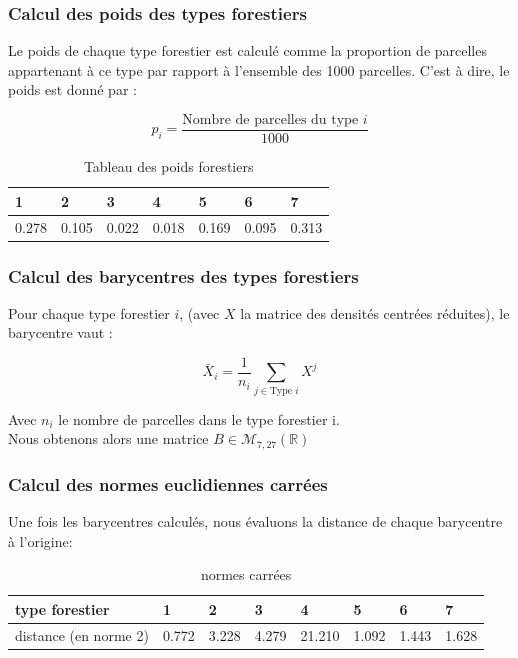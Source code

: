 \documentclass{article}
\begin{document}
\subsubsection{Calcul des poids des types forestiers}
Le poids de chaque type forestier est calculé comme la proportion de parcelles appartenant à ce type par rapport à l'ensemble des 1000 parcelles. C'est à dire, le poids est donné par :

\[
p_i = \frac{\text{Nombre de parcelles du type } i}{1000}
\]

\begin{table}[H]
    \center
    \caption{Tableau des poids forestiers}
    \begin{tabular}{|l|l|l|l|l|l|l|}
    \hline
    1     & 2     & 3     & 4     & 5     & 6     & 7     \\ \hline
    0.278 & 0.105 & 0.022 & 0.018 & 0.169 & 0.095 & 0.313 \\ \hline
    \end{tabular}
    \end{table}


\subsubsection{Calcul des barycentres des types forestiers}
Pour chaque type forestier $i$,  (avec $X$ la matrice des densités centrées réduites), le barycentre vaut :

\[
\bar{X}_i = \frac{1}{n_i} \sum_{j \in \text{Type } i} X^j
\]

Avec $n_i$ le nombre de parcelles dans le type forestier i.
\\
Nous obtenons alors une matrice $B \in \mathcal{M}_{7,27}(\mathbb{R})$


\subsubsection{Calcul des normes euclidiennes carrées}
Une fois les barycentres calculés, nous évaluons la distance de chaque barycentre à l'origine:

\begin{table}[H]
    \centering
    \caption{normes carrées}
    \begin{tabular}{|l|l|l|l|l|l|l|l|}
    \hline
    type forestier       & 1         & 2         & 3         & 4      & 5     & 6     & 7     \\ \hline
    distance (en norme 2) & 0.772 & 3.228 & 4.279 & 21.210 & 1.092 & 1.443 & 1.628 \\ \hline
    \end{tabular}
    \end{table}
\end{document}

